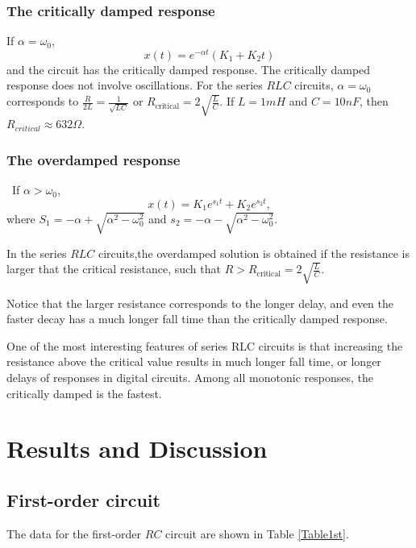 \documentclass{article}
\begin{document}
		\subsubsection{The critically damped response}
If $\alpha = \omega_0$,
$$x(t) = e^{-\alpha t}(K_1 + K_2 t)$$
and the circuit has the critically damped response. The critically damped response does not involve oscillations. For the series $RLC$ circuits, $\alpha = \omega_0$ corresponds to $\frac{R}{2L} = \frac{1}{\sqrt{LC}}$ or $R_{\text{critical}} = 2\sqrt{\frac{L}{C}}$. If $L=1mH$ and $C=10nF$, then $R_{critical} \approx 632\Omega$.

		\subsubsection{The overdamped response}\
If $\alpha > \omega_0$, 
$$x(t) = K_1e^{s_1 t}+K_2e^{s_2t},$$
where $S_1 = -\alpha +\sqrt{\alpha^2-\omega_0^2}$ and $s_2 = -\alpha -\sqrt{\alpha^2 - \omega_0^2}$.

In the series $RLC$ circuits,the overdamped solution is obtained if the resistance is larger that the critical resistance, such that $R > R_{\text{critical}}=2 \sqrt{\frac{L}{C}}$. 

Notice that the larger resistance corresponds to the longer delay, and even the faster decay has a much longer fall time than the critically damped response. 

One of the most interesting features of series RLC circuits is that increasing the
resistance above the critical value results in much longer fall time, or longer delays
of responses in digital circuits. Among all monotonic responses, the critically
damped is the fastest.

\section{Results and Discussion}

	\subsection{First-order circuit}

The data for the first-order $RC$ circuit are shown in Table \ref{Table1st}.
\end{document}
